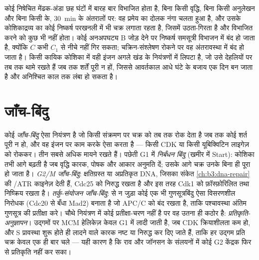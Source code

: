 \begin{example}[मेंढक का अंडा घड़ी क्यों है]\label{ex:b3:cell-cycle-apoptosis:frog}
कोई निषेचित मेंढक-अंडा छह घंटों में बारह बार विभाजित होता है, बिना किसी
वृद्धि, बिना किसी अनुलेखन और बिना किसी  के,
\qty{30}{min} के अंतरालों पर: वह प्रमेय का दोलक नंगा चलता हुआ है, और
उसके कोशिकाद्रव्य का कोई निष्कर्ष परखनली में भी चक्र लगाता रहता है,
जिसमें  उठता-गिरता है और विभाजित करने को कुछ भी नहीं होता। कोई
अनअपघट्य  B जोड़ देने पर निष्कर्ष समसूत्री विभाजन में बंद हो जाता
है, क्योंकि $C$ कभी $C_{1}$ से नीचे नहीं गिर सकता; चक्रिन-संश्लेषण
रोकने पर वह अंतरावस्था में बंद हो जाता है। किसी कायिक कोशिका में वही
इंजन अगले खंड के नियंत्रणों में लिपटा है, जो उसे देहलियों पर तब तक थामे
रखते हैं जब तक शर्तें पूरी न हों, जिससे आवर्तकाल आधे घंटे के बजाय एक दिन
बन जाता है और अनिश्चित काल तक लंबा हो सकता है।
\end{example}

\section{जाँच-बिंदु}

\begin{definition}[जाँच-बिंदु]\label{def:b3:cell-cycle-apoptosis:checkpoints}
कोई \emph{जाँच-बिंदु} ऐसा नियंत्रण है जो किसी संक्रमण पर चक्र को तब तक
रोक देता है जब तक कोई शर्त पूरी न हो, और वह इंजन पर काम करके ऐसा करता
है --- किसी CDK या किसी यूबिक्विटिन लाइगेज़ को रोककर। तीन सबसे अधिक
मायने रखते हैं। पछेती G1 में \emph{निर्बंधन बिंदु} (खमीर में Start):
कोशिका तभी आगे बढ़ती है जब वृद्धि कारक, पोषक और आकार अनुमति दें; उसके
आगे चक्र उनके बिना ही पूरा हो जाता है। \emph{G2/M जाँच-बिंदु}:
क्षतिग्रस्त या अप्रतिकृत DNA, जिसका संकेत
\cref{ch:b3:dna-repair} की /ATR काइनेज़ देती हैं, Cdc25 को निरुद्ध
रखता है और इस तरह Cdk1 को फ़ॉस्फ़ोरिलित तथा निष्क्रिय रखता है।
\emph{तर्कु-संयोजन जाँच-बिंदु}:  से न जुड़ा कोई एक भी
गुणसूत्रबिंदु ऐसा विसरणशील निरोधक (Cdc20 से बँधा Mad2) बनाता है जो
APC/C को बंद रखता है, ताकि पश्चावस्था अंतिम गुणसूत्र की प्रतीक्षा करे।
चौथे नियंत्रण में कोई प्रतीक्षा-चरण नहीं है पर वह उतना ही कठोर है:
\emph{प्रतिकृति-अनुज्ञापन}। उद्गमों पर MCM हेलिकेज़ केवल G1 में लादी
जाती है, जब CDK क्रियाशीलता कम हो, और S प्रावस्था शुरू होते ही लादने
वाले कारक नष्ट या निरुद्ध कर दिए जाते हैं, ताकि हर उद्गम प्रति चक्र
केवल एक ही बार चले --- यही कारण है कि राव और जॉनसन के संलयनों में कोई
G2 केंद्रक फिर से प्रतिकृति नहीं कर सका।
\end{definition}

